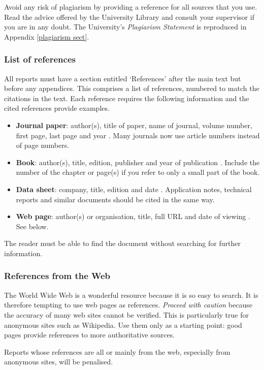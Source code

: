 \documentclass[a4paper,12pt]{article}
\begin{document}
Avoid any risk of plagiarism by providing a reference for all sources that you use. Read the advice offered by the University Library and consult your supervisor if you are in any doubt. The University's \emph{Plagiarism Statement} is reproduced in Appendix \ref{plagiarism sect}.

\subsubsection{List of references}

All reports must have a section entitled `References' after the main text but before any appendices. This comprises a list of references, numbered to match the citations in the text. Each reference requires the following information and the cited references provide examples.
\begin{itemize}
\item
\textbf{Journal paper}: 
author(s), title of paper, name of journal, volume number, first page, last page and year \cite{gmf87}. 
Many journals now use article numbers instead of page numbers.
\item
\textbf{Book}: 
author(s), title, edition, publisher and year of publication \cite{jve05}.
Include the number of the chapter or page(s) if you refer to only a small part of the book.
\item
\textbf{Data sheet}: 
company, title, edition and date \cite{s08qg}. 
Application notes, technical reports and similar documents should be cited in the same way.
\item
\textbf{Web page}: 
author(s) or organisation, title, full URL and date of viewing \cite{mac09}. See below.
\end{itemize}
The reader must be able to find the document without searching for further information.

\subsubsection{References from the Web}

The World Wide Web is a wonderful resource because it is so easy to search. It is therefore tempting to use web pages as references. \emph{Proceed with caution} because the accuracy of many web sites cannot be verified. This is particularly true for anonymous sites such as Wikipedia. Use them only as a starting point: good pages provide references to more authoritative sources.

Reports whose references are all or mainly from the web, especially from anonymous sites, will be penalised.
\end{document}
